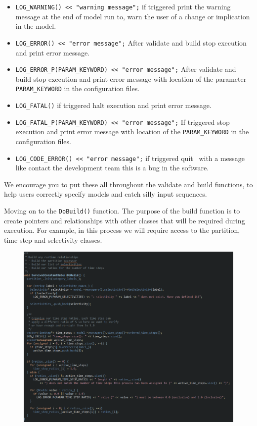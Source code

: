 \begin{itemize}
	\item \texttt{LOG\_WARNING() << "warning message";} if triggered print the warning message at the end of model run to, warn the user of a change or implication in the model.
	\item \texttt{LOG\_ERROR() << "error message";} After validate and build stop execution and print error message.
	\item \texttt{LOG\_ERROR\_P(PARAM\_KEYWORD) << "error message";} After validate and build stop execution and print error message with location of the parameter \texttt{PARAM\_KEYWORD} in the configuration files.
	\item \texttt{LOG\_FATAL()} if triggered halt execution and print error message.
	\item \texttt{LOG\_FATAL\_P(PARAM\_KEYWORD) << "error message";} If triggered stop execution and print error message with location of the \texttt{PARAM\_KEYWORD} in the configuration files.		
	\item \texttt{LOG\_CODE\_ERROR() << "error message";} if triggered quit \CNAME\ with a message like contact the development team this is a bug in the software.	
\end{itemize}

We encourage you to put these all throughout the validate and build functions{\color{red},} to help users correctly specify models and catch silly {\color{red}input} sequences.


Moving on to the \texttt{DoBuild()} function. The purpose of the build function is to create pointers and relationships with other classes that will be required during execution. For example{\color{red},} in this process we will require access to the partition, time step and selectivity classes.

\begin{figure}[!ht]
	\centering
	\includegraphics[scale=0.7]{Figures/Build.png}
	\caption{}\label{fig:build}
\end{figure}


